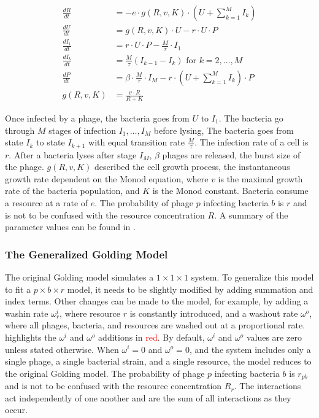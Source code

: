 \begin{equation} \label{eq:golding_model}
    \begin{aligned}
        \frac{dR}{dt} &= -e \cdot g(R, v, K)\cdot (U + \sum_{k=1}^{M} I_k)\\
        \frac{dU}{dt} &= g(R, v, K)\cdot U - r\cdot U \cdot P\\
        \frac{dI_1}{dt} &= r\cdot U \cdot P - \frac{M}{\tau}\cdot I_1\\
        \frac{dI_k}{dt} &= \frac{M}{\tau}(I_{k-1}-I_k) \text{ for } k=2, \dots, M \\
        \frac{dP}{dt} &= \beta \cdot\frac{M}{\tau} \cdot I_M - r\cdot(U + \sum_{k=1}^{M} I_k)\cdot P \\
        g(R, v, K) &= \frac{v\cdot R}{R + K}
    \end{aligned}
\end{equation}

Once infected by a phage, the bacteria goes from $U$ to $I_1$. 
The bacteria go through $M$ stages of infection $I_1, \dots, I_M$ before lysing, 
The bacteria goes from state $I_k$ to state $I_{k+1}$ with equal transition rate $\frac{M}{\tau}$. 
The infection rate of a cell is $r$. 
After a bacteria lyses after stage $I_M$, $\beta$ phages are released, the burst size of the phage. 
$g(R, v, K)$ described the cell growth process, the instantaneous growth rate dependent on the Monod equation, where $v$ is the maximal growth rate of the bacteria population, and $K$ is the Monod constant. 
Bacteria consume a resource at a rate of $e$. 
The probability of phage $p$ infecting bacteria $b$ is $r$ and is not to be confused with the resource concentration $R$. 
A summary of the parameter values can be found in . 

\subsubsection{The Generalized Golding Model}
\label{sec:adapted_golding_model}
The original Golding model simulates a $1\times 1 \times 1$ system. 
To generalize this model to fit a $p \times b \times r$ model, it needs to be slightly modified by adding summation and index terms. 
Other changes can be made to the model, for example, by adding a washin rate $\omega^{i}_r$, where resource $r$ is constantly introduced, and a washout rate $\omega^{o}$, where all phages, bacteria, and resources are washed out at a proportional rate. 
 highlights the $\omega^i$ and $\omega^o$ additions in \textcolor{red}{red}. 
By default, $\omega^i$ and $\omega^o$ values are zero unless stated otherwise.
When $\omega^i=0$ and $\omega^o=0$, and the system includes only a single phage, a single bacterial strain, and a single resource, the model reduces to the original Golding model.
The probability of phage $p$ infecting bacteria $b$ is $r_{pb}$ and is not to be confused with the resource concentration $R_r$. 
The interactions act independently of one another and are the sum of all interactions as they occur. 

